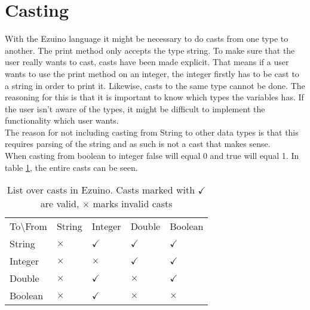 \section{Casting}
With the Ezuino language it might be necessary to do casts from one type to another.
The print method only accepts the type string. To make sure that the user really wants to cast, casts have been made explicit.
That means if a user wants to use the print method on an integer, the integer firstly has to be cast to a string in order to print it.
Likewise, casts to the same type cannot be done. The reasoning for this is that it is important to know which types the variables has. If the user isn't aware of the types, it might be difficult to implement the functionality which user wants.\\
The reason for not including casting from String to other data types is that this requires parsing of the string and as such is not a cast that makes sense.\\
When casting from boolean to integer false will equal 0 and true will equal 1.
In table \ref{tab:cast-overview}, the entire casts can be seen.
\begin{table}[H]
\centering
\begin{tabular}{lllll}
To\textbackslash From & String   & Integer      & Double       & Boolean      \\
String                & $\times$ & $\checkmark$ & $\checkmark$ & $\checkmark$ \\
Integer               & $\times$ & $\times$     & $\checkmark$ & $\checkmark$ \\
Double                & $\times$ & $\checkmark$ & $\times$     & $\checkmark$ \\
Boolean               & $\times$ & $\checkmark$ & $\times$     & $\times$    
\end{tabular}
\caption{List over casts in Ezuino. Casts marked with $\checkmark$ are valid, $\times$ marks invalid casts}
\label{tab:cast-overview}
\end{table}